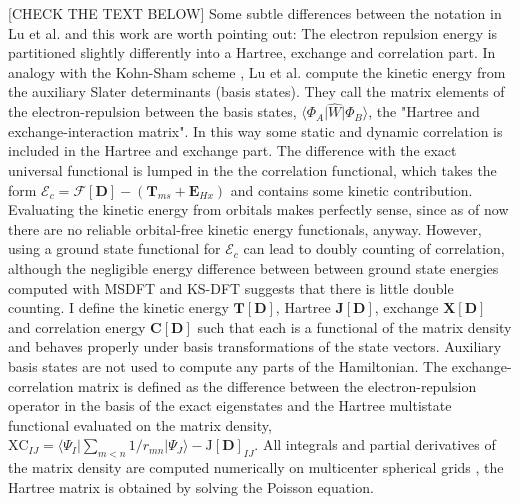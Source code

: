 \documentclass[journal=jacsat,manuscript=article]{achemso}
\newcommand\m[1]{\mathbf{#1}}
\begin{document}
[CHECK THE TEXT BELOW]
Some subtle differences between the notation in Lu et al. \cite{Lu2022JPCL,Lu2022JCTC} and this work are worth pointing out:
The electron repulsion energy is partitioned slightly differently into a Hartree, exchange and correlation part.
In analogy with the Kohn-Sham scheme \cite{Kohn1965}, Lu et al. compute the kinetic energy from the auxiliary Slater determinants (basis states).
They call the matrix elements of the electron-repulsion between the basis states,
$\langle \Phi_A \vert \hat{W} \vert \Phi_B \rangle$, the "Hartree and exchange-interaction matrix".
In this way some static and dynamic correlation is included in the Hartree and exchange part.
The difference with the exact universal functional is lumped in the the correlation functional, which takes the
form $\mathcal{E}_c = \mathcal{F}[\m{D}] - (\m{T}_{ms} + \m{E}_{Hx})$ \cite[Eqn.~(22)]{Lu2022JPCL}
and contains some kinetic contribution.
Evaluating the kinetic energy from orbitals
makes perfectly sense, since as of now there are no reliable orbital-free kinetic energy functionals, anyway.
However, using a ground state functional for $\mathcal{E}_c$ can lead to doubly counting of correlation,
although the negligible energy difference between between ground state energies computed with MSDFT and KS-DFT
suggests that there is little double counting. \cite{Zhu2023}
I define the kinetic energy $\m{T}[\m{D}]$, Hartree $\m{J}[\m{D}]$, exchange $\m{X}[\m{D}]$ and correlation energy
$\m{C}[\m{D}]$ such that each is a functional of the matrix density and behaves properly under basis transformations
of the state vectors.
Auxiliary basis states are not used to compute any parts of the Hamiltonian.
The exchange-correlation matrix is defined as the difference between the
electron-repulsion operator in the basis of the exact eigenstates
and the Hartree multistate functional evaluated on the matrix density, $\text{XC}_{IJ} =
\langle \Psi_I \vert \sum_{m < n} 1/r_{mn} \vert \Psi_J \rangle - \text{J}[\mathbf{D}]_{IJ}$.
All integrals and partial derivatives of the matrix density are computed numerically on
multicenter spherical grids \cite{Becke1988grid,Lebedev1976}, the Hartree matrix is obtained by solving the Poisson
equation. \cite{Becke1988Poisson}


\end{document}
